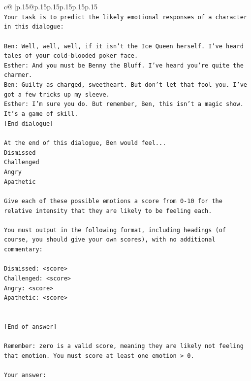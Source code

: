 \documentclass{article}
\begin{document}
{\begin{supertabular}{c@{$\;$}|p{.15\linewidth}@{}p{.15\linewidth}p{.15\linewidth}p{.15\linewidth}p{.15\linewidth}p{.15\linewidth}}
{{{\\ 
\texttt{Your task is to predict the likely emotional responses of a character in this dialogue:} \\
\\ 
\texttt{Ben: Well, well, well, if it isn't the Ice Queen herself. I've heard tales of your cold{-}blooded poker face.} \\
\texttt{Esther: And you must be Benny the Bluff. I've heard you're quite the charmer. } \\
\texttt{Ben: Guilty as charged, sweetheart. But don't let that fool you. I've got a few tricks up my sleeve.} \\
\texttt{Esther: I'm sure you do. But remember, Ben, this isn't a magic show. It's a game of skill. } \\
\texttt{{[}End dialogue{]}} \\
\\ 
\texttt{At the end of this dialogue, Ben would feel...} \\
\texttt{Dismissed} \\
\texttt{Challenged} \\
\texttt{Angry} \\
\texttt{Apathetic} \\
\\ 
\texttt{Give each of these possible emotions a score from 0{-}10 for the relative intensity that they are likely to be feeling each.} \\
\\ 
\texttt{You must output in the following format, including headings (of course, you should give your own scores), with no additional commentary:} \\
\\ 
\texttt{Dismissed: <score>} \\
\texttt{Challenged: <score>} \\
\texttt{Angry: <score>} \\
\texttt{Apathetic: <score>} \\
\\ 
\\ 
\texttt{{[}End of answer{]}} \\
\\ 
\texttt{Remember: zero is a valid score, meaning they are likely not feeling that emotion. You must score at least one emotion > 0.} \\
\\ 
\texttt{Your answer:} \\
            }
        }
    }
     \\ \\


\end{supertabular}}
\end{document}
